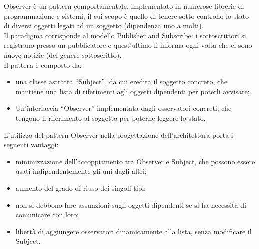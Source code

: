 	 \label{app:observer}
		Observer è un pattern comportamentale, implementato in numerose librerie di programmazione e sistemi, il cui scopo è quello di tenere sotto controllo lo stato di diversi oggetti legati ad un soggetto (dipendenza uno a molti). \\
		Il paradigma corrisponde al modello Publisher and Subscribe: i sottoscrittori si registrano presso un pubblicatore e quest’ultimo li informa ogni volta che ci sono nuove notizie (del genere sottoscritto).\\
		Il pattern è composto da:
		\begin{itemize}
		\item una classe astratta “Subject”, da cui eredita il soggetto concreto, che mantiene una lista di riferimenti agli oggetti dipendenti per poterli avvisare;
		\item Un’interfaccia “Observer” implementata dagli osservatori concreti, che tengono il riferimento al soggetto per poterne leggere lo stato.
		\end{itemize}
			L’utilizzo del pattern Observer nella progettazione dell’architettura porta i seguenti vantaggi:
			\begin{itemize}
			\item minimizzazione dell’accoppiamento tra Observer e Subject, che possono essere usati indipendentemente gli uni dagli altri;
			\item aumento del grado di riuso dei singoli tipi;
			\item non si debbono fare assunzioni sugli oggetti dipendenti se si ha necessità di comunicare con loro;
			\item libertà di aggiungere osservatori dinamicamente alla lista, senza modificare il Subject.
			\end{itemize}

